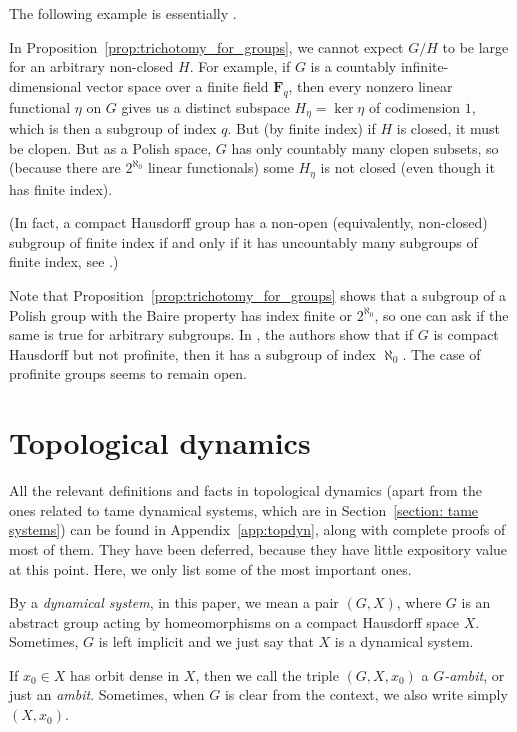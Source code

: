 	The following example is essentially \cite[Example 3.39]{KM14}.
	\begin{ex}
		\label{ex:trichotomy_counterexample}
		In Proposition~\ref{prop:trichotomy_for_groups}, we cannot expect $G/H$ to be large for an arbitrary non-closed $H$. For example, if $G$ is a countably infinite-dimensional vector space over a finite field $\mathbf F_q$, then every nonzero linear functional $\eta$ on $G$ gives us a distinct subspace $H_\eta=\ker \eta$ of codimension $1$, which is then a subgroup of index $q$. But (by finite index) if $H$ is closed, it must be clopen. But as a Polish space, $G$ has only countably many clopen subsets, so (because there are $2^{\aleph_0}$ linear functionals) some $H_\eta$ is not closed (even though it has finite index).
		
		(In fact, a compact Hausdorff group has a non-open (equivalently, non-closed) subgroup of finite index if and only if it has uncountably many subgroups of finite index, see \cite[Theorem 2]{SW03}.)\xqed{\lozenge}
	\end{ex}
	
	\begin{rem}
		Note that Proposition~\ref{prop:trichotomy_for_groups} shows that a subgroup of a Polish group with the Baire property has index finite or $2^{\aleph_0}$, so one can ask if the same is true for arbitrary subgroups. In \cite[Theorem 2.3]{HHM16}, the authors show that if $G$ is compact Hausdorff but not profinite, then it has a subgroup of index $\aleph_0$. The case of profinite groups seems to remain open.\xqed{\lozenge}
	\end{rem}
	
	
	
	
	
	\section{Topological dynamics}
	\label{sec:prel_topdyn}
	All the relevant definitions and facts in topological dynamics (apart from the ones related to tame dynamical systems, which are in Section~\ref{section: tame systems}) can be found in Appendix~\ref{app:topdyn}, along with complete proofs of most of them. They have been deferred, because they have little expository value at this point. Here, we only list some of the most important ones.
	
	\begin{dfn}
		\label{dfn:dyn_system_pre}
		By a \emph{dynamical system}, in this paper, we mean a pair $(G,X)$, where $G$ is an abstract group acting by homeomorphisms on a compact Hausdorff space $X$. Sometimes, $G$ is left implicit and we just say that $X$ is a dynamical system.
		
		If $x_0\in X$ has orbit dense in $X$, then we call the triple $(G,X,x_0)$ a \emph{$G$-ambit}, or just an \emph{ambit}. Sometimes, when $G$ is clear from the context, we also write simply $(X,x_0)$.
		\xqed{\lozenge}
	\end{dfn}
	
